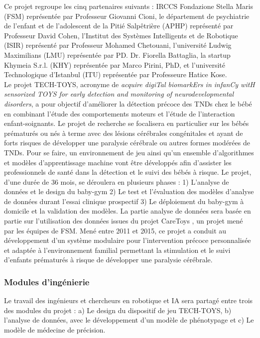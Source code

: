 \documentclass[8pt]{article}
\begin{document}
\par Ce projet regroupe les cinq partenaires suivants : IRCCS Fondazione Stella Maris (FSM) représentée par Professeur Giovanni Cioni, le département de psychiatrie de l’enfant et de l’adolescent de la Pitié Salpêtrière (APHP) représenté par Professeur David Cohen, l’Institut des Systèmes Intelligents et de Robotique (ISIR) représenté par Professeur Mohamed Chetouani, l’université Ludwig Maximilians (LMU) représentée par PD. Dr. Fiorella Battaglia, la startup Khymeia S.r.l. (KHY) représentée par Marco Pirini,
PhD, et l’université Technologique d’Istanbul (ITU) représentée par Professeure Hatice Kose.\\
Le projet TECH-TOYS, acronyme de \textit{acquire digiTal biomarkErs in infanCy witH sensorized TOYS for
early detection and monitoring of neurodevelopmental disorders}, a pour objectif d’améliorer la détection
précoce des TNDs chez le bébé en combinant l’étude des comportements moteurs et l’étude de l’interaction
enfant-soignants. Le projet de recherche se focalisera en particulier sur les bébés prématurés ou nés à terme
avec des lésions cérébrales congénitales et ayant de forts risques de développer une paralysie cérébrale ou
autres formes modérées de TNDs. Pour se faire, un environnement de jeu ainsi qu’un ensemble d’algorithmes
et modèles d’apprentissage machine vont être développés afin d’assister les professionnels de santé dans
la détection et le suivi des bébés à risque. Le projet, d’une durée de 36 mois, se déroulera en plusieurs
phases : 1) L’analyse de données et le design du baby-gym 2) Le test et l’évaluation des modèles d’analyse
de données durant l’essai clinique prospectif 3) Le déploiement du baby-gym à domicile et la validation des
modèles. La partie analyse de données sera basée en partie sur l’utilisation des données issues du projet
CareToys \cite{rihar_infant_2019}, un projet mené par les équipes de FSM. Mené entre 2011 et 2015, ce projet
a conduit au développement d’un système modulaire pour l’intervention précoce personnalisée et adaptée à l’environnement familial permettant la stimulation et le suivi d’enfants prématurés à risque de développer une paralysie cérébrale.

\subsubsection{Modules d'ingénierie}
\par Le travail des ingénieurs et chercheurs en robotique et IA sera partagé entre trois des modules du projet : a) Le design du dispositif de jeu TECH-TOYS, b) l’analyse de données, avec le développement d’un modèle de phénotypage et c) Le modèle de médecine de précision.\\ \\
 
\end{document}
